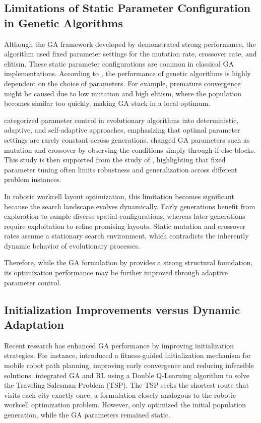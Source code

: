 \documentclass{article}
\begin{document}
\subsection{Limitations of Static Parameter Configuration in Genetic Algorithms}

Although the GA framework developed by \textcite{sim2005rwl} demonstrated strong performance, the algorithm used fixed parameter settings for the mutation rate, crossover rate, and elitism. These static parameter configurations are common in classical GA implementations. According to \textcite{goldberg1989genetic}, the performance of genetic algorithms is highly dependent on the choice of parameters. For example, premature convergence might be caused due to low mutation and high elitism, where the population becomes similar too quickly, making GA stuck in a local optimum.

\textcite{eiben1999parametercontrol} categorized parameter control in evolutionary algorithms into deterministic, adaptive, and self-adaptive approaches, emphasizing that optimal parameter settings are rarely constant across generations. \textcite{eiben1999parametercontrol} changed GA parameters such as mutation and crossover by observing the conditions simply through if-else blocks. This study is then supported from the study of \textcite{karafotias2015trends}, highlighting that fixed parameter tuning often limits robustness and generalization across different problem instances.

In robotic workcell layout optimization, this limitation becomes significant because the search landscape evolves dynamically. Early generations benefit from exploration to sample diverse spatial configurations, whereas later generations require exploitation to refine promising layouts. Static mutation and crossover rates assume a stationary search environment, which contradicts the inherently dynamic behavior of evolutionary processes.

Therefore, while the GA formulation by \textcite{sim2005rwl} provides a strong structural foundation, its optimization performance may be further improved through adaptive parameter control.

\subsection{Initialization Improvements versus Dynamic Adaptation}

Recent research has enhanced GA performance by improving initialization strategies. For instance, \textcite{abwahab2024eswa} introduced a fitness-guided initialization mechanism for mobile robot path planning, improving early convergence and reducing infeasible solutions. \textcite{ruan2024tsp} integrated GA and RL using a Double Q-Learning algorithm to solve the Traveling Salesman Problem (TSP). The TSP seeks the shortest route that visits each city exactly once, a formulation closely analogous to the robotic workcell optimization problem. However, \textcite{ruan2024tsp} only optimized the initial population generation, while the GA parameters remained static.
\end{document}
